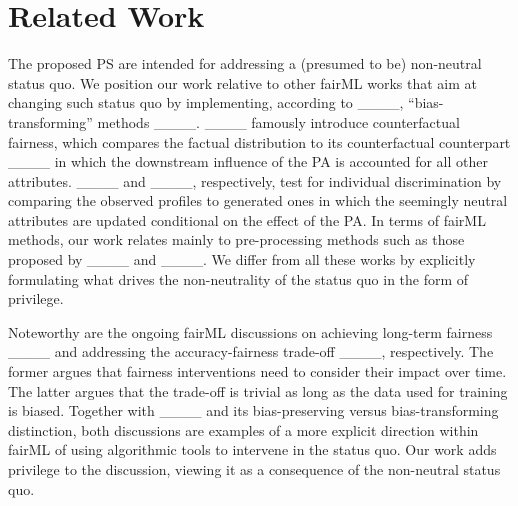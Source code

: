 \section{Related Work}
\label{sec:related-work}

The proposed PS are intended for addressing a (presumed to be) non-neutral status quo.
We position our work relative to other fairML works that aim at changing such status quo by implementing, according to 
____, ``bias-transforming'' methods ____.
____ famously introduce counterfactual fairness, which compares the factual distribution to its counterfactual counterpart ____ in which the downstream influence of the PA is accounted for all other attributes.
____ and ____, respectively, test for individual discrimination by comparing the observed profiles to generated ones in which the seemingly neutral attributes are updated conditional on the effect of the PA.
In terms of fairML methods, our work relates mainly to pre-processing methods such as those proposed by ____ and ____.
We differ from all these works by explicitly formulating what drives the non-neutrality of the status quo in the form of privilege.

Noteworthy are the ongoing fairML discussions on achieving long-term fairness ____ and addressing the accuracy-fairness trade-off  ____, respectively.
The former argues that fairness interventions need to consider their impact over time. 
The latter argues that the trade-off is trivial as long as the data used for training is biased. 
Together with ____ and its bias-preserving versus bias-transforming distinction, 
both discussions are examples of a more explicit direction within fairML of using algorithmic tools to intervene in the status quo.
Our work adds privilege to the discussion, viewing it as a consequence of the non-neutral status quo.


